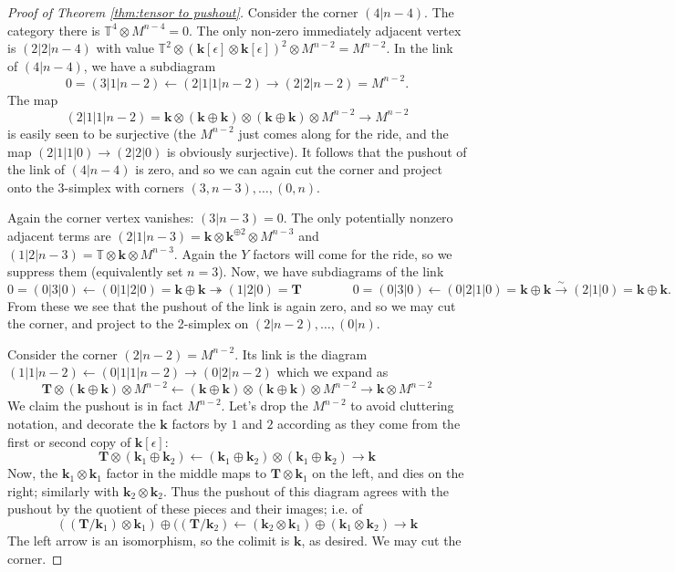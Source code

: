 \documentclass[10pt,a4paper]{amsart}
\begin{document}
\begin{proof}[Proof of Theorem \ref{thm:tensor to pushout}]
    Consider the corner $(4|n-4)$.  The category there is $\mathbb{T}^4 \otimes M^{n-4}=0$.  The only non-zero immediately adjacent vertex is $(2|2|n-4)$ with value $\mathbb{T}^2  \otimes (\mathbf{k}[\epsilon] \otimes \mathbf{k}[\epsilon])^2 \otimes M^{n-2} = M^{n-2}$.  In the link of $(4|n-4)$, we have a subdiagram 
    $$0 = (3|1|n-2) \leftarrow  (2|1|1|n-2) \rightarrow  (2|2|n-2) = M^{n-2}.$$  The map 
    $$(2|1|1|n-2) = \mathbf{k} \otimes (\mathbf{k} \oplus \mathbf{k}) \otimes (\mathbf{k} \oplus \mathbf{k})  \otimes M^{n-2} \to M^{n-2}$$ is easily seen to be surjective (the $M^{n-2}$ just comes along for the ride, and the map $(2|1|1|0) \to (2|2|0)$ is obviously surjective).  It follows that the pushout of the link of $(4|n-4)$ is zero, and so we can again cut the corner and project onto the 3-simplex with corners $(3, n-3),\ldots, (0,n)$.

    Again the corner vertex vanishes: $(3|n-3) = 0$. The only potentially nonzero adjacent terms are $(2|1|n-3) = \mathbf{k} \otimes \mathbf{k}^{\oplus 2} \otimes M^{n-3}$ and $(1|2|n-3) = \mathbb{T} \otimes \mathbf{k} \otimes M^{n-3}$.  Again the $Y$ factors will come for the ride, so we suppress them (equivalently set $n=3$).   Now, 
    we have subdiagrams of the link 
    $$0 = (0|3| 0) \leftarrow (0|1|2|0) = \mathbf{k} \oplus \mathbf{k}  \twoheadrightarrow (1|2|0) = \mathbf{T} \qquad \qquad 0 = (0|3|0) \leftarrow (0|2|1|0) = \mathbf{k} \oplus \mathbf{k} \xrightarrow{\sim} (2|1|0) = \mathbf{k} \oplus \mathbf{k}. $$
    From these we see that the pushout of the link is again zero, and so we may cut the corner, and project to the 2-simplex on $(2| n-2), \ldots, (0|n)$. 

    Consider the corner $(2|n-2) = M^{n-2}$.  Its link is the diagram $(1|1|n-2) \leftarrow (0|1|1|n-2) \rightarrow (0|2|n-2)$ which we expand as
    $$\mathbf{T} \otimes (\mathbf{k} \oplus \mathbf{k}) \otimes M^{n-2} \leftarrow (\mathbf{k} \oplus \mathbf{k}) \otimes (\mathbf{k} \oplus \mathbf{k}) \otimes M^{n-2} \rightarrow \mathbf{k} \otimes  M^{n-2}$$
    We claim the pushout is in fact $M^{n-2}$.  Let's drop the $M^{n-2}$ to avoid cluttering notation, and decorate the $\mathbf{k}$ factors by $1$ and $2$ according as they come from the first or second copy of $\mathbf{k}[\epsilon]$:
    $$\mathbf{T} \otimes (\mathbf{k}_1 \oplus \mathbf{k}_2)  \leftarrow (\mathbf{k}_1 \oplus \mathbf{k}_2) \otimes (\mathbf{k}_1 \oplus \mathbf{k}_2) \rightarrow \mathbf{k} $$
    Now, the $\mathbf{k}_1 \otimes \mathbf{k}_1$ factor in the middle maps to $\mathbf{T} \otimes \mathbf{k}_1$ on the left, and dies on the right; similarly with $\mathbf{k}_2 \otimes \mathbf{k}_2$.  
    Thus the pushout of this diagram agrees with the pushout by the quotient of these pieces and their images; i.e. of 
    $$((\mathbf{T}/\mathbf{k}_1) \otimes \mathbf{k}_1) \oplus ((\mathbf{T} /\mathbf{k}_2)  \leftarrow 
    (\mathbf{k}_2 \otimes \mathbf{k}_1) \oplus (\mathbf{k}_1 \otimes \mathbf{k}_2)\rightarrow \mathbf{k}$$
    The left arrow is an isomorphism, so the colimit is $\mathbf{k}$, as desired.  We may cut the corner. 


\end{proof}
\end{document}
